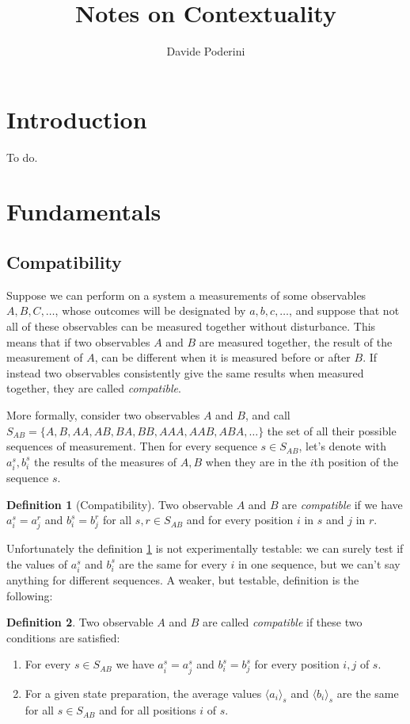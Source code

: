 \documentclass[a4paper]{article}
\theoremstyle{definition}
\newtheorem{definition}{Definition}[section]
\begin{document}
\title{Notes on Contextuality}
\author{Davide Poderini}
\date{}
\maketitle

\section{Introduction}
To do.
\section{Fundamentals}
\subsection{Compatibility}
Suppose we can perform on a system a measurements of some observables $A, B, C, \ldots$,
whose outcomes will be designated by $a, b, c, \ldots$, and suppose that not all of these
observables can be measured together without disturbance.
This means that if two observables $A$ and $B$ are measured together, the result of the
measurement of $A$, can be different when it is measured before or after $B$.
If instead two observables consistently give the same results when measured
together, they are called \emph{compatible}.

More formally, consider two observables $A$ and $B$, and call\\
$S_{AB}=\{A,B,AA,AB,BA,BB,AAA,AAB,ABA,\ldots\}$ the set of all their possible
sequences of measurement. 
Then for every sequence $s \in S_{AB}$, let's denote with $a_i^s,b_i^s$ the
results of the measures of $A,B$ when they are in the $i$th position of the
sequence $s$. 
\begin{definition}[Compatibility]
    Two observable $A$ and $B$ are \emph{compatible} if we have $a_i^s=a_j^r$
    and $b_i^s=b_j^r$ for all $s,r \in S_{AB}$ and for every position $i$ in $s$
    and $j$ in $r$.
    \label{def:compatibility1}
\end{definition}

Unfortunately the definition \ref{def:compatibility1} is not experimentally testable:
we can surely test if the values of $a_i^s$ and $b_i^s$ are the same for every
$i$ in one sequence, but we can't say anything for different sequences.
A weaker, but testable, definition is the following:
\begin{definition}
    Two observable $A$ and $B$ are called \emph{compatible} if these two conditions are
    satisfied:
    \begin{enumerate}
        \item For every $s \in S_{AB}$ we have $a_i^s=a_j^s$ and $b_i^s=b_j^s$
            for every position $i,j$ of $s$.
        \item For a given state preparation, the average values
            $\langle{a_i}\rangle_s$ and $\langle{b_i}\rangle_s$ are the same for
            all $s \in S_{AB}$ and for all positions $i$ of $s$.
    \end{enumerate}
    \label{def:compatibility2}
\end{definition}
\end{document}
